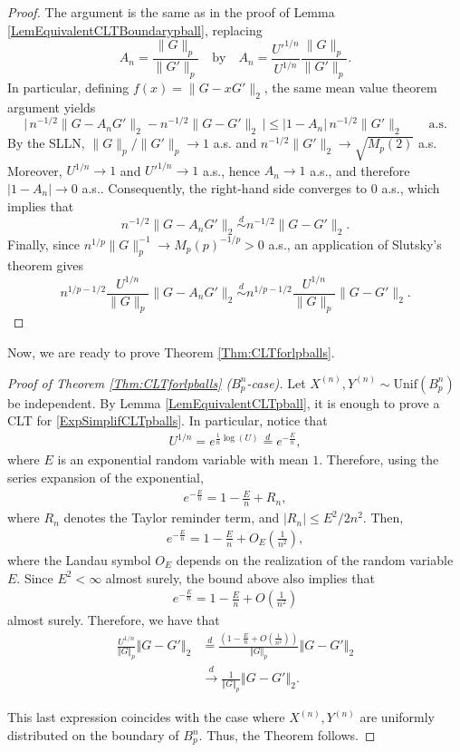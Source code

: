 \documentclass[10pt]{amsart}
\newcounter{theor}
\numberwithin{equation}{section}
\begin{document}
\begin{proof}
The argument is the same as in the proof of Lemma \ref{LemEquivalentCLTBoundarypball}, replacing
\[
A_n=\frac{\|G\|_p}{\|G'\|_p}
\quad\text{by}\quad
A_n=\frac{U'^{1/n}}{U^{1/n}}\frac{\|G\|_p}{\|G'\|_p}.
\]
In particular, defining $f(x)=\|G-xG'\|_2$, the same mean value theorem argument yields
\[
\big|\,n^{-1/2}\|G-A_nG'\|_2-n^{-1/2}\|G-G'\|_2\,\big|
\le |1-A_n|\,n^{-1/2}\|G'\|_2
\qquad\text{a.s.}
\]
By the SLLN, $\|G\|_p/\|G'\|_p\to 1$ a.s. and $n^{-1/2}\|G'\|_2\to \sqrt{M_p(2)}$ a.s.
Moreover, $U^{1/n}\to 1$ and $U'^{1/n}\to 1$ a.s., hence $A_n\to 1$ a.s., and therefore $|1-A_n|\to 0$ a.s..
Consequently, the right-hand side converges to $0$ a.s., which implies that
\[
n^{-1/2}\|G-A_nG'\|_2 \overset{d}{\sim} n^{-1/2}\|G-G'\|_2.
\]
Finally, since $n^{1/p}\|G\|_p^{-1}\to M_p(p)^{-1/p}>0$ a.s., an application of Slutsky's theorem gives
\[
n^{1/p-1/2}\frac{U^{1/n}}{\|G\|_p}\|G-A_nG'\|_2
\overset{d}{\sim}
n^{1/p-1/2}\frac{U^{1/n}}{\|G\|_p}\|G-G'\|_2.
\]
\end{proof}

Now, we are ready to prove Theorem \ref{Thm:CLTforlpballs}.
\begin{proof}[Proof of Theorem \ref{Thm:CLTforlpballs} ($B_p^n$-case)]
Let $X^{(n)}, Y^{(n)} \sim \text{Unif} (B_p^n)$ be independent. By Lemma \ref{LemEquivalentCLTpball}, it is enough to prove a CLT for \eqref{ExpSimplifCLTpballs}.
In particular, notice that 
\begin{align*}
U^{1/n} = e^{\frac{1}{n} \log (U)} \overset{d}{=} e^{-\frac{E}{n}},
\end{align*}
where $E$ is an exponential random variable with mean $1$. Therefore, using the series expansion of the exponential,
\begin{align*}
 e^{-\frac{E}{n}} = 1- \frac{E}{n} + R_n,
\end{align*}
where $R_n$ denotes the Taylor reminder term, and $|R_n| \leq E^2 / 2n^2$. Then,
\begin{align*}
e^{-\frac{E}{n}} = 1- \frac{E}{n} + O _E \left( \frac{1}{n^2} \right),
\end{align*}
where the Landau symbol $O_E$ depends on the realization of the random variable $E$. Since $E^2 < \infty$ almost surely, the bound above also implies that 
\begin{align*}
e^{-\frac{E}{n}} = 1- \frac{E}{n} + O \left( \frac{1}{n^2} \right)
\end{align*}
almost surely. Therefore, we have that 
\begin{align*}
\frac{U^{1/n}}{\Vert G \Vert _p} \left\Vert G -   G' \right\Vert _2 & \overset{d}{=} \frac{\left( 1- \frac{E}{n} + O \left( \frac{1}{n^2} \right)  \right)}{\Vert G \Vert _p} \left\Vert G -   G' \right\Vert _2
 \\
 & \overset{d}{\longrightarrow} \frac{1}{\Vert G \Vert _p} \left\Vert G -   G' \right\Vert _2 .
\end{align*}

This last expression coincides with the case where $X^{(n)}, Y^{(n)}$ are uniformly distributed on the boundary of $B_p^n$. Thus, the Theorem follows.
\end{proof}
\end{document}
